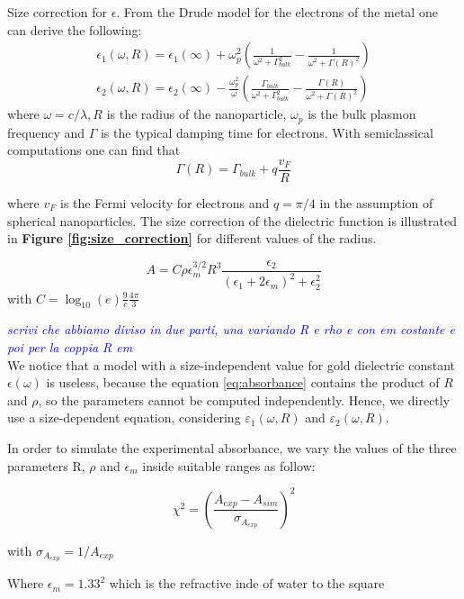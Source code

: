 \documentclass[twocolumn]{article}
\newcommand{\gio}[1]{\textcolor{blue}{\textit{#1}}}
\begin{document}
\begin{multicols}{2}
\noindent
Size correction for $\epsilon$. From the Drude model for the electrons of the metal one can derive the following:
$$
\begin{array}{l}
\epsilon_{1}(\omega, R)=\epsilon_{1}(\infty)+\omega_{p}^{2}\left(\frac{1}{\omega^{2}+\Gamma_{bulk}^{2}}-\frac{1}{\omega^{2}+\Gamma(R)^{2}}\right) \\
\epsilon_{2}(\omega, R)=\epsilon_{2}(\infty)-\frac{\omega_{p}^{2}}{\omega}\left(\frac{\Gamma_{bulk}}{\omega^{2}+\Gamma_{bulk}^{2}}-\frac{\Gamma(R)}{\omega^{2}+\Gamma(R)^{2}}\right)
\end{array}
$$
where $\omega=c / \lambda, R$ is the radius of the nanoparticle, $\omega_{p}$ is the bulk plasmon frequency and $\Gamma$ is the typical damping time for electrons. With semiclassical computations one can find that
$$
\Gamma(R)=\Gamma_{bulk}+q \frac{v_{F}}{R}
$$

where $v_{F}$ is the Fermi velocity for electrons and $q=\pi / 4$ in the assumption of spherical nanoparticles. The size correction of the dielectric function is illustrated in \textbf{Figure \ref{fig:size_correction}} for different values of the radius.

\begin{equation}
    A=C\rho\epsilon_m^{3/2}R^3\frac{\epsilon_2}{(\epsilon_1 + 2\epsilon_m)^2 + \epsilon_2^2}
\end{equation}
with $C=\log_{10}(e)\frac{9}{c}\frac{4\pi}{3}$

\gio{scrivi che abbiamo diviso in due parti, una variando R e rho e con em costante e poi per la coppia R em} \\

We notice that a model with a size-independent value for gold dielectric constant $\epsilon(\omega)$ is useless, because the equation \ref{eq:absorbance} contains the product of $R$ and $\rho$, so the parameters cannot be computed independently. Hence, we directly use a size-dependent equation, considering $\varepsilon_1(\omega,R)$ and $\varepsilon_2(\omega,R)$.

In order to simulate the experimental absorbance, we vary the values of the three parameters R, $\rho$ and $\epsilon_m$ inside suitable ranges as follow:

\begin{equation}
    \chi^2=\left(\frac{A_{exp} - A_{sim}}{\sigma_{A_{exp}}}\right)^2
\end{equation}

with $\sigma_{A_{exp}}=1/A_{exp}$


Where $\epsilon_m = 1.33^2$ which is the refractive inde of water to the square


\end{multicols}
\end{document}
